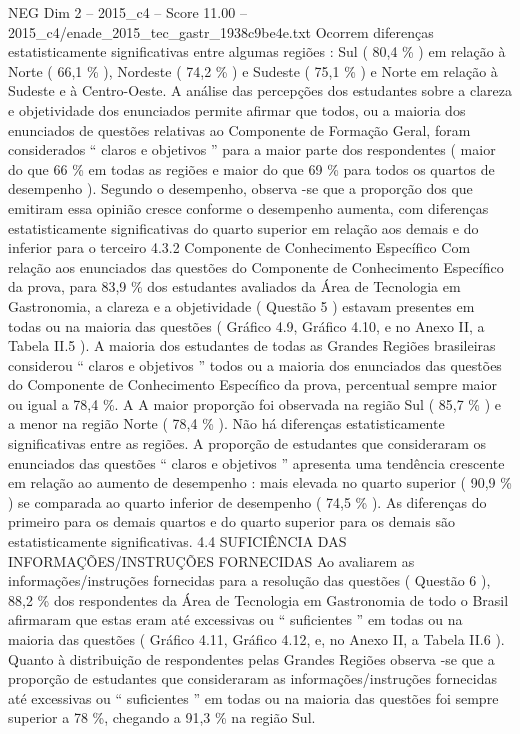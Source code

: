 \begin{textsample}{NEG Dim 2 – 2015\_c4 – Score 11.00 – 2015\_c4/enade\_2015\_tec\_gastr\_1938c9be4e.txt}
Ocorrem diferenças estatisticamente significativas entre algumas regiões : Sul ( 80,4 \% ) em relação à Norte ( 66,1 \% ), Nordeste ( 74,2 \% ) e Sudeste ( 75,1 \% ) e Norte em relação à Sudeste e à Centro-Oeste.
A análise das percepções dos estudantes sobre a clareza e objetividade dos enunciados permite afirmar que todos, ou a maioria dos enunciados de questões relativas ao Componente de Formação Geral, foram considerados “ claros e objetivos ” para a maior parte dos respondentes ( maior do que 66 \% em todas as regiões e maior do que 69 \% para todos os quartos de desempenho ).
Segundo o desempenho, observa -se que a proporção dos que emitiram essa opinião cresce conforme o desempenho aumenta, com diferenças estatisticamente significativas do quarto superior em relação aos demais e do inferior para o terceiro 4.3.2 Componente de Conhecimento Específico Com relação aos enunciados das questões do Componente de Conhecimento Específico da prova, para 83,9 \% dos estudantes avaliados da Área de Tecnologia em Gastronomia, a clareza e a objetividade ( Questão 5 ) estavam presentes em todas ou na maioria das questões ( Gráfico 4.9, Gráfico 4.10, e no Anexo II, a Tabela II.5 ).
A maioria dos estudantes de todas as Grandes Regiões brasileiras considerou “ claros e objetivos ” todos ou a maioria dos enunciados das questões do Componente de Conhecimento Específico da prova, percentual sempre maior ou igual a 78,4 \%.
A A maior proporção foi observada na região Sul ( 85,7 \% ) e a menor na região Norte ( 78,4 \% ).
Não há diferenças estatisticamente significativas entre as regiões.
A proporção de estudantes que consideraram os enunciados das questões “ claros e objetivos ” apresenta uma tendência crescente em relação ao aumento de desempenho : mais elevada no quarto superior ( 90,9 \% ) se comparada ao quarto inferior de desempenho ( 74,5 \% ).
As diferenças do primeiro para os demais quartos e do quarto superior para os demais são estatisticamente significativas. 4.4 SUFICIÊNCIA DAS INFORMAÇÕES/INSTRUÇÕES FORNECIDAS Ao avaliarem as informações/instruções fornecidas para a resolução das questões ( Questão 6 ), 88,2 \% dos respondentes da Área de Tecnologia em Gastronomia de todo o Brasil afirmaram que estas eram até excessivas ou “ suficientes ” em todas ou na maioria das questões ( Gráfico 4.11, Gráfico 4.12, e, no Anexo II, a Tabela II.6 ).
Quanto à distribuição de respondentes pelas Grandes Regiões observa -se que a proporção de estudantes que consideraram as informações/instruções fornecidas até excessivas ou “ suficientes ” em todas ou na maioria das questões foi sempre superior a 78 \%, chegando a 91,3 \% na região Sul.

\end{textsample}
